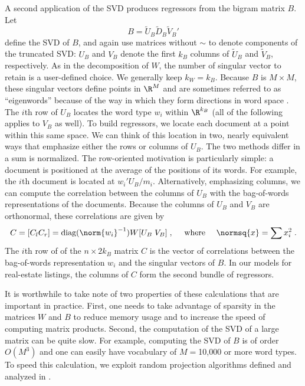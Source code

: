 \documentclass[10pt]{article}
\begin{document}
 
 A second application of the SVD produces regressors from the bigram matrix $B$.
  Let
 \begin{equation}
       B = \tilde{U}_B \tilde{D}_B \tilde{V}_B'
 \label{eq:svdB}
 \end{equation}
 define the SVD of $B$, and again use matrices without $\sim$ to denote components of the truncated SVD:  $U_B$ and $V_B$ denote the first $k_B$ columns of $\tilde{U}_B$ and $\tilde{V}_B$, respectively.  As in the
 decomposition of $W$, the number of singular vector to retain is a user-defined choice.  We generally keep $k_W = k_B$.  Because $B$ is $M
 \times M$, these singular vectors define points in $\R^M$ and are sometimes referred to as ``eigenwords'' because of the way in which they form directions in word space .  The $i$th row of $U_B$  locates the word type $w_i$ within $\R^{k_B}$  (all of the following applies  to $V_B$ as well).  To build regressors, we locate each document at a point within this same space.  We can think of this location in two, nearly equivalent ways that emphasize either the rows or columns of $U_B$.  The two methods differ in a sum is normalized.  The row-oriented motivation is particularly simple: a document is positioned at the average of the positions of its words.  For example, the $i$th document is located at $w_i'U_B/m_i$.  Alternatively, emphasizing columns, we can compute the correlation between the columns of $U_B$ with the bag-of-words representations of the documents.  Because the columns of $U_B$  and $V_B$ are orthonormal, these correlations are given by
 \begin{equation}
     C = [C_l C_r] 
         = \mbox{diag}(\norm{w_i}^{-1})W[U_B \; V_B]   \;, 
            \quad \mbox{ where } \quad  \normsq{x} = \sum x_i^2  \;.
 \label{eq:C}
 \end{equation}
 The $i$th row of of the $n \times 2k_B$ matrix $C$ is the vector of correlations between the bag-of-words representation $w_i$ and the singular vectors of $B$.  In our models for real-estate listings, the columns of $C$ form the second bundle of regressors.


 It is worthwhile to take note of two properties of these calculations that are
 important in practice.  First, one needs to take advantage of sparsity in the
 matrices $W$ and $B$ to reduce memory usage and to increase the speed of
 computing matrix products.  Second, the computation of the SVD of a large
 matrix can be quite slow.  For example, computing the SVD of $B$ is of order
 $O(M^3)$ and one can easily have vocabulary of $M=$10,000 or more word types.
  To speed this calculation, we exploit random projection algorithms defined and
 analyzed in \citet{tropp10}.
\end{document}
